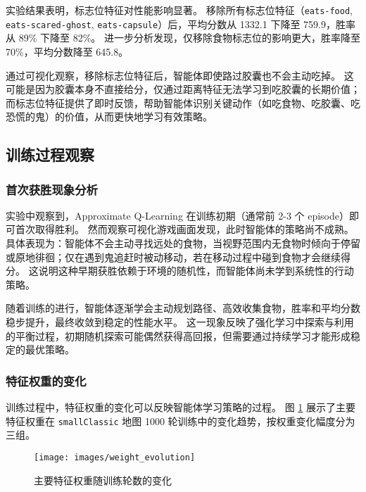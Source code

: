 实验结果表明，标志位特征对性能影响显著。
移除所有标志位特征（\texttt{eats-food}, \texttt{eats-scared-ghost}, \texttt{eats-capsule}）后，平均分数从 1332.1 下降至 759.9，胜率从 89\% 下降至 82\%。
进一步分析发现，仅移除食物标志位的影响更大，胜率降至 70\%，平均分数降至 645.8。

通过可视化观察，移除标志位特征后，智能体即使路过胶囊也不会主动吃掉。
这可能是因为胶囊本身不直接给分，仅通过距离特征无法学习到吃胶囊的长期价值；
而标志位特征提供了即时反馈，帮助智能体识别关键动作（如吃食物、吃胶囊、吃恐慌的鬼）的价值，从而更快地学习有效策略。

\subsection{训练过程观察}

\subsubsection{首次获胜现象分析}

实验中观察到，Approximate Q-Learning 在训练初期（通常前 2-3 个 episode）即可首次取得胜利。
然而观察可视化游戏画面发现，此时智能体的策略尚不成熟。
具体表现为：智能体不会主动寻找远处的食物，当视野范围内无食物时倾向于停留或原地徘徊；仅在遇到鬼追赶时被动移动，若在移动过程中碰到食物才会继续得分。
这说明这种早期获胜依赖于环境的随机性，而智能体尚未学到系统性的行动策略。

随着训练的进行，智能体逐渐学会主动规划路径、高效收集食物，胜率和平均分数稳步提升，最终收敛到稳定的性能水平。
这一现象反映了强化学习中探索与利用的平衡过程，初期随机探索可能偶然获得高回报，但需要通过持续学习才能形成稳定的最优策略。

\subsubsection{特征权重的变化}

训练过程中，特征权重的变化可以反映智能体学习策略的过程。
图 \ref{fig:weight_evolution} 展示了主要特征权重在 \texttt{smallClassic} 地图 1000 轮训练中的变化趋势，按权重变化幅度分为三组。

\begin{figure}[htbp]
    \centering
    \texttt{[image: images/weight\_evolution]}
    \caption{主要特征权重随训练轮数的变化}
    \label{fig:weight_evolution}
\end{figure}


